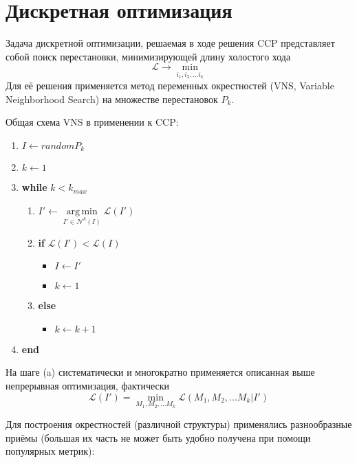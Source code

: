 \documentclass{article}
\DeclareMathOperator*{\argmin}{arg\,min}
\begin{document}
\section{Дискретная оптимизация}

Задача дискретной оптимизации,
решаемая в ходе решения CCP
представляет собой поиск перестановки,
минимизирующей длину холостого хода
$$
\mathcal L \to \min_{i_1, i_2, \dots i_k}
$$
Для её решения применяется метод переменных окрестностей
(VNS, Variable Neighborhood Search)
на множестве перестановок $P_k$.

Общая схема VNS в применении к CCP:
\begin{enumerate}
    \item $ I \gets random P_k$
    \item $ k \gets 1$
    \item \textbf{while} $k < k_{max}$
    \begin{enumerate}
    \item $ I' \gets \argmin\limits_{I' \in \mathcal N^k(I)} \mathcal L(I')$
    \item \textbf{if} $\mathcal L(I') < \mathcal L(I)$
    \begin{itemize}
        \item $I \gets I'$
        \item $ k \gets 1$
    \end{itemize}
    \item \textbf{else}
    \begin{itemize}
        \item $ k \gets k+1$
    \end{itemize}
    \end{enumerate}
    \item \textbf{end}
\end{enumerate}
На шаге (a)
систематически и многократно применяется описанная выше
непрерывная оптимизация,
фактически
$$
\mathcal L(I') = \min_{M_1, M_2, \dots M_k} \mathcal L(M_1, M_2, \dots M_k | I')
$$

Для построения окрестностей
(различной структуры)
применялись разнообразные приёмы
(большая их часть не может быть удобно
получена при помощи популярных метрик):
\end{document}
